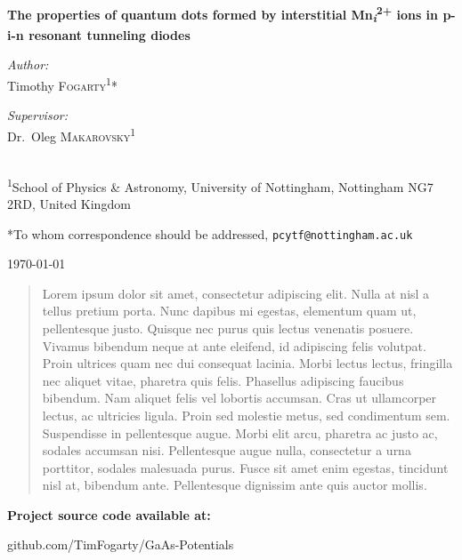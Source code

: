 \message{ !name(report.tex)}\documentclass[]{article}
\begin{document}

\begin{titlepage}
\begin{center}

\vspace*{1.0cm} 
{\huge \bfseries The properties of quantum dots formed by interstitial Mn\textsubscript{\emph{i}}\textsuperscript{2+} ions in p-i-n resonant tunneling diodes \\[0.4cm] }
\vspace{0.8cm} 

\begin{minipage}{0.4\textwidth}
\begin{flushleft} \large
\emph{Author:}\\
Timothy \textsc{Fogarty}\textsuperscript{1}* 
\end{flushleft}
\end{minipage}
\begin{minipage}{0.4\textwidth}
\begin{flushright} \large
\emph{Supervisor:} \\
Dr.~Oleg \textsc{Makarovsky}\textsuperscript{1}
\end{flushright}
\end{minipage}
\\[0.8cm]
\textsuperscript{1}School of Physics \& Astronomy, University of Nottingham, Nottingham NG7 2RD, United Kingdom

*To whom correspondence should be addressed, \texttt{pcytf@nottingham.ac.uk}

\vspace{0.8cm} 
{\large \today}
\vspace{0.8cm} 

\begin{abstract}
Lorem ipsum dolor sit amet, consectetur adipiscing elit. Nulla at nisl a tellus pretium porta. Nunc dapibus mi egestas, elementum quam ut, pellentesque justo. Quisque nec purus quis lectus venenatis posuere. Vivamus bibendum neque at ante eleifend, id adipiscing felis volutpat. Proin ultrices quam nec dui consequat lacinia. Morbi lectus lectus, fringilla nec aliquet vitae, pharetra quis felis. Phasellus adipiscing faucibus bibendum. Nam aliquet felis vel lobortis accumsan. Cras ut ullamcorper lectus, ac ultricies ligula. Proin sed molestie metus, sed condimentum sem. Suspendisse in pellentesque augue. Morbi elit arcu, pharetra ac justo ac, sodales accumsan nisi. Pellentesque augue nulla, consectetur a urna porttitor, sodales malesuada purus. Fusce sit amet enim egestas, tincidunt nisl at, bibendum ante. Pellentesque dignissim ante quis auctor mollis.
\end{abstract}



\vfill

\textbf{Project source code available at:}

github.com/TimFogarty/GaAs-Potentials




\end{center}
\end{titlepage}
\end{document}
